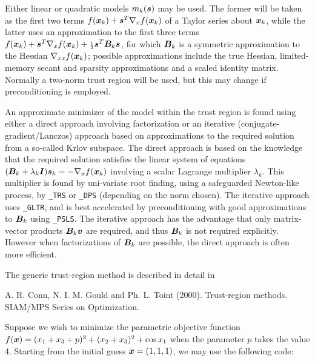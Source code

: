 \documentclass{galahad}
\begin{document}
Either linear or quadratic models $m_k({\bm{s}})$ may be used. The former will be
taken as the first two terms $f({\bm{x}}_k) + {\bm{s}}^T \nabla_x f({\bm{x}}_k)$
of a Taylor series about ${\bm{x}}_k$, while the latter uses an
approximation to the first three terms
$f({\bm{x}}_k) + {\bm{s}}^T \nabla_x f({\bm{x}}_k) + {\scriptstyle \frac{1}{2}}
{\bm{s}}^T {\bm{B}}_k {\bm{s}}$,
for which ${\bm{B}}_k$ is a symmetric approximation to the Hessian
$\nabla_{xx} f({\bm{x}}_k)$; possible approximations include the true Hessian,
limited-memory secant and sparsity approximations and a scaled identity matrix.
Normally a two-norm trust region will be used, but this may change
if preconditioning is employed.

An approximate minimizer of the model within the trust region
is found using either a direct approach involving factorization or an
iterative (conjugate-gradient/Lanczos) approach based on approximations
to the required solution from a so-called Krlov subspace. The direct
approach is based on the knowledge that the required solution
satisfies the linear system of equations $({\bm{B}}_k + \lambda_k {\bm{I}}) {\bm{s}}_k
= - \nabla_x f({\bm{x}}_k)$ involving a scalar Lagrange multiplier $\lambda_k$.
This multiplier is found by uni-variate root finding, using a safeguarded
Newton-like process, by {\tt \libraryname\_TRS} or {\tt \libraryname\_DPS}
(depending on the norm chosen). The iterative approach
uses {\tt \libraryname\_GLTR}, and is best accelerated by preconditioning
with good approximations to ${\bm{B}}_k$ using {\tt \libraryname\_PSLS}. The
iterative approach has the advantage that only matrix-vector products
${\bm{B}}_k {\bm{v}}$ are required, and thus ${\bm{B}}_k$ is not required explicitly.
However when factorizations of ${\bm{B}}_k$ are possible, the direct approach
is often more efficient.
\vspace*{1mm}

\galreferences
\vspace*{1mm}

\noindent
The generic trust-region method is described in detail in
\vspace*{1mm}

\noindent
A. R. Conn, N. I. M. Gould and Ph. L. Toint (2000).
Trust-region methods.
SIAM/MPS Series on Optimization.


\galexamples
Suppose we wish to minimize the parametric objective function
$f({\bm{x}}) = ( x_1 + x_3 + p )^2 + ( x_2 + x_3 )^2 + \cos x_1$
when the parameter $p$ takes the value 4. Starting from the
initial guess ${\bm{x}} = (1,1,1)$,
we may use the following code:
\end{document}
